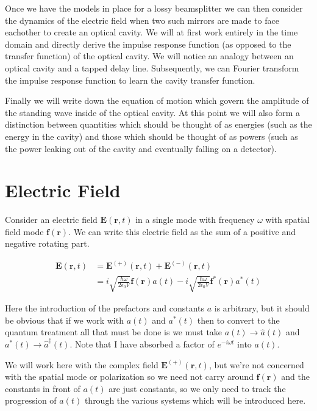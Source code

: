 \documentclass[12pt]{article}
\newcommand{\bv}[1]{\boldsymbol{#1}}
\begin{document}
Once we have the models in place for a lossy beamsplitter we can then consider the dynamics of the electric field when two such mirrors are made to face eachother to create an optical cavity. We will at first work entirely in the time domain and directly derive the impulse response function (as opposed to the transfer function) of the optical cavity. We will notice an analogy between an optical cavity and a tapped delay line. Subsequently, we can Fourier transform the impulse response function to learn the cavity transfer function.

Finally we will write down the equation of motion which govern the amplitude of the standing wave inside of the optical cavity. At this point we will also form a distinction between quantities which should be thought of as energies (such as the energy in the cavity) and those which should be thought of as powers (such as the power leaking out of the cavity and eventually falling on a detector).

\section{Electric Field}

Consider an electric field $\bv{E}(\bv{r},t)$ in a single mode with frequency $\omega$ with spatial field mode $\bv{f}(\bv{r})$. We can write this electric field as the sum of a positive and negative rotating part.

\begin{align}
\bv{E}(\bv{r},t) &= \bv{E}^{(+)}(\bv{r},t) + \bv{E}^{(-)}(\bv{r},t)\\
&= i\sqrt{\frac{\hbar \omega}{2\epsilon_0 V}} \bv{f}(\bv{r}) a(t) - i\sqrt{\frac{\hbar \omega}{2\epsilon_0 V}} \bv{f}^*(\bv{r})a^*(t)
\end{align}

Here the introduction of the prefactors and constants $a$ is arbitrary, but it should be obvious that if we work with $a(t)$ and $a^*(t)$ then to convert to the quantum treatment all that must be done is we must take $a(t) \to \hat{a}(t)$ and $a^*(t) \to \hat{a}^{\dag}(t)$. Note that I have absorbed a factor of $e^{-i \omega t}$ into $a(t)$.

We will work here with the complex field $\bv{E}^{(+)}(\bv{r},t)$, but we're not concerned with the spatial mode or polarization so we need not carry around $\bv{f}(\bv{r})$ and the constants in front of $a(t)$ are just constants, so we only need to track the progression of $a(t)$ through the various systems which will be introduced here.
\end{document}

